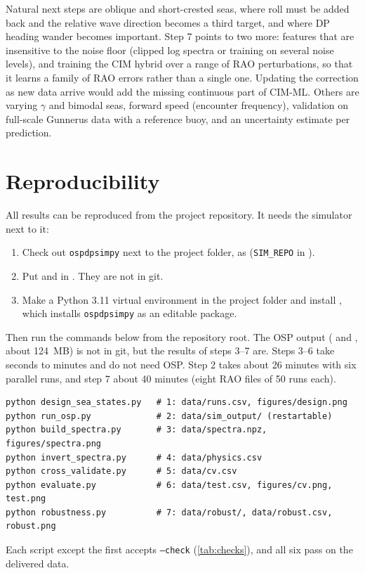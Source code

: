 \documentclass[11pt,a4paper]{article}
\begin{document}
Natural next steps are oblique and short-crested seas, where roll must be added back and the
relative wave direction becomes a third target, and where DP heading wander becomes important.
Step 7 points to two more: features that are insensitive to the noise floor (clipped log spectra
or training on several noise levels), and training the CIM hybrid over a range of RAO perturbations,
so that it learns a family of RAO errors rather than a single one. Updating the correction as
new data arrive would add the missing continuous part of CIM-ML. Others are varying $\gamma$
and bimodal seas, forward speed (encounter frequency), validation on full-scale Gunnerus data
with a reference buoy, and an uncertainty estimate per prediction.

\section{Reproducibility}
\label{sec:repro}

All results can be reproduced from the project repository. It needs the simulator next to it:
\begin{enumerate}
  \item Check out \texttt{ospdpsimpy} \citep{ospdpsimpy} next to the project folder, as
         (\texttt{SIM\_REPO} in ).
  \item Put  and  in
        . They are not in git.
  \item Make a Python 3.11 virtual environment in the project folder and install
        , which installs \texttt{ospdpsimpy} as an editable package.
\end{enumerate}
Then run the commands below from the repository root. The OSP output (
and , about \SI{124}{MB}) is not in git, but the results of steps 3--7 are.
Steps 3--6 take seconds to minutes and do not need OSP. Step 2 takes about 26 minutes with six
parallel runs, and step 7 about 40 minutes (eight RAO files of 50 runs each).

\begin{verbatim}
python design_sea_states.py   # 1: data/runs.csv, figures/design.png
python run_osp.py             # 2: data/sim_output/ (restartable)
python build_spectra.py       # 3: data/spectra.npz, figures/spectra.png
python invert_spectra.py      # 4: data/physics.csv
python cross_validate.py      # 5: data/cv.csv
python evaluate.py            # 6: data/test.csv, figures/cv.png, test.png
python robustness.py          # 7: data/robust/, data/robust.csv, robust.png
\end{verbatim}
Each script except the first accepts \texttt{--check} (\cref{tab:checks}), and all six pass on the
delivered data.
\end{document}
